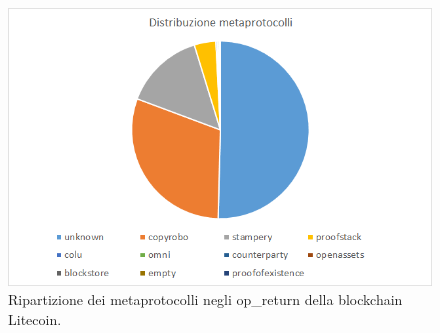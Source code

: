 \begin{figure}
	\centering
	\includegraphics[width=1.0\linewidth]{images/distribuzioneopreturn}
	\caption{Ripartizione dei metaprotocolli negli op\_return della blockchain Litecoin.}
	\label{fig:distribuzioneopreturn}
\end{figure}

